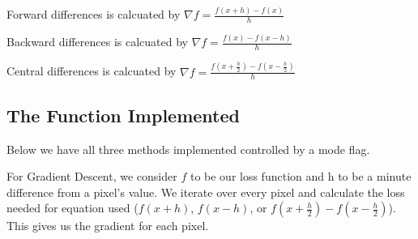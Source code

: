 \documentclass[letterpaper,10pt,english]{jupyterBook}
\begin{document}
\sphinxAtStartPar
Forward differences is calcuated by \(\nabla f = \frac{f(x+h)-f(x)}{h}\)

\sphinxAtStartPar
Backward differences is calcuated by \(\nabla f = \frac{f(x) - f(x-h)}{h}\)

\sphinxAtStartPar
Central differences is calcuated by \(\nabla f = \frac{f(x+\frac{h}{2})-f(x-\frac{h}{2})}{h}\)


\subsection{The Function Implemented}
\label{\detokenize{finite_gradient:the-function-implemented}}
\sphinxAtStartPar
Below we have all three methods implemented controlled by a mode flag.

\sphinxAtStartPar
For Gradient Descent, we consider \(f\) to be our loss function and h to be a minute difference from a pixel’s value. We iterate over every pixel and calculate the loss needed for equation used (\(f(x+h)\), \(f(x-h)\), or \(f(x+\frac{h}{2})-f(x-\frac{h}{2})\)). This gives us the gradient for each pixel.
\end{document}
